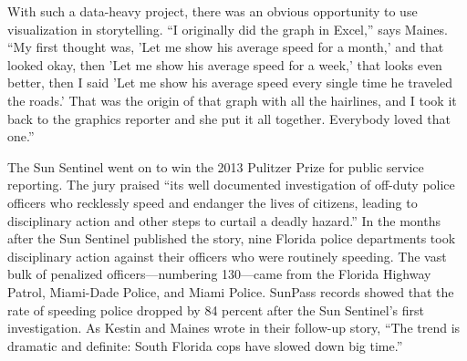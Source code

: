 With such a data-heavy project, there was an obvious opportunity to use
visualization in storytelling. ``I originally did the graph in Excel,'' says Maines.
``My first thought was, 'Let me show his average speed for a month,' and that
looked okay, then 'Let me show his average speed for a week,' that looks
even better, then I said 'Let me show his average speed every single time he
traveled the roads.' That was the origin of that graph with all the hairlines,
and I took it back to the graphics reporter and she put it all together. Everybody
loved that one.''

The Sun Sentinel went on to win the 2013 Pulitzer Prize for public service
reporting. The jury praised ``its well documented investigation of off-duty
police officers who recklessly speed and endanger the lives of citizens, leading
to disciplinary action and other steps to curtail a deadly hazard.'' In
the months after the Sun Sentinel published the story, nine Florida police
departments took disciplinary action against their officers who were routinely
speeding. The vast bulk of penalized officers—numbering 130—came from the Florida Highway Patrol, Miami-Dade Police, and Miami Police.
SunPass records showed that the rate of speeding police dropped by 84 percent
after the Sun Sentinel's first investigation. As Kestin and Maines wrote
in their follow-up story, ``The trend is dramatic and definite: South Florida
cops have slowed down big time.''

